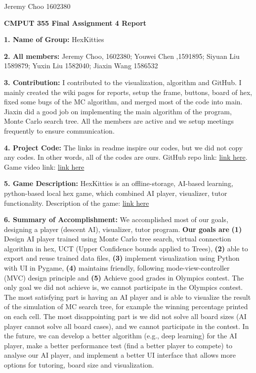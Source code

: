 \documentclass[12pt]{article}
\begin{document}
Jeremy Choo 1602380

\begin{center}
\textbf{CMPUT 355	Final Assignment 4 Report}
 \end{center} 

\textbf{1. Name of Group:} HexKitties

\textbf{2. All members:} Jeremy Choo, 1602380; Youwei Chen ,1591895; Siyuan Liu 1589879; Yuxin Liu 1582040; Jiaxin Wang 1586532

\textbf{3. Contribution:} I contributed to the visualization, algorithm and GitHub. I mainly created the wiki pages for reports, setup the frame, buttons, board of hex, fixed some bugs of the MC algorithm, and merged most of the code into main. Jiaxin did a good job on implementing the main algorithm of the program, Monte Carlo search tree. All the members are active and we setup meetings frequently to ensure communication.

\textbf{4. Project Code:} The links in readme inspire our codes, but we did not copy any codes. In other words, all of the codes are ours. GitHub repo link: \href{https://github.com/HexKitties/CMPUT355HexKitties}{link here}. Game video link: \href{https://github.com/HexKitties/CMPUT355HexKitties/blob/main/HexDemo.mp4}{link here}

\textbf{5. Game Description:} HexKitties is an offline-storage, AI-based learning, python-based local hex game, which combined AI player, visualizer, tutor functionality. Description of the game: \href{http://www.mseymour.ca/hex_book/hexstrat.html}{link here}

\textbf{6. Summary of Accomplishment:} We accomplished most of our goals, designing a player (descent AI), visualizer, tutor program. \textbf{Our goals are} \textbf{(1)} Design AI player trained using Monte Carlo tree search, virtual connection algorithm in hex, UCT (Upper Confidence bounds applied to Trees), \textbf{(2)} able to export and reuse trained data files, \textbf{(3)} implement visualization using Python with UI in Pygame, \textbf{(4)} maintains friendly, following mode-view-controller (MVC) design principle and \textbf{(5)} Achieve good grades in Olympics contest. The only goal we did not achieve is, we cannot participate in the Olympics contest. The most satisfying part is having an AI player and is able to visualize the result of the simulation of MC search tree, for example the winning percentage printed on each cell. The most disappointing part is we did not solve all board sizes (AI player cannot solve all board cases), and we cannot participate in the contest. In the future, we can develop a better algorithm (e.g., deep learning) for the AI player, make a better performance test (find a better player to compete) to analyse our AI player, and implement a better UI interface that allows more options for tutoring, board size and visualization.
\end{document}
